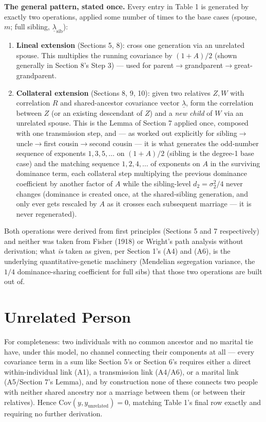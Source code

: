 \documentclass[12pt]{article}
\begin{document}
\textbf{The general pattern, stated once.} Every entry in Table 1 is generated by exactly two operations, applied some number of times to the base cases (spouse, $m$; full sibling, $\underline\lambda_{\mathrm{sib}}$):
\begin{enumerate}
\item \textbf{Lineal extension} (Sections 5, 8): cross one generation via an unrelated spouse. This multiplies the running covariance by $(1+A)/2$ (shown generally in Section 8's Step 3) — used for parent$\to$grandparent$\to$great-grandparent.
\item \textbf{Collateral extension} (Sections 8, 9, 10): given two relatives $Z,W$ with correlation $R$ and shared-ancestor covariance vector $\underline\lambda$, form the correlation between $Z$ (or an existing descendant of $Z$) and a \emph{new child} of $W$ via an unrelated spouse. This is the Lemma of Section 7 applied once, composed with one transmission step, and — as worked out explicitly for sibling$\to$uncle$\to$first cousin$\to$second cousin — it is what generates the odd-number sequence of exponents $1,3,5,\ldots$ on $(1+A)/2$ (sibling is the degree-1 base case) and the matching sequence $1,2,4,\ldots$ of exponents on $A$ in the surviving dominance term, each collateral step multiplying the previous dominance coefficient by another factor of $A$ while the sibling-level $d_2=\sigma_2^2/4$ never changes (dominance is created once, at the shared-sibling generation, and only ever gets rescaled by $A$ as it crosses each subsequent marriage — it is never regenerated).
\end{enumerate}
Both operations were derived from first principles (Sections 5 and 7 respectively) and neither was taken from Fisher (1918) or Wright's path analysis without derivation; what \emph{is} taken as given, per Section 1's (A4) and (A6), is the underlying quantitative-genetic machinery (Mendelian segregation variance, the $1/4$ dominance-sharing coefficient for full sibs) that those two operations are built out of.

\section{Unrelated Person}

For completeness: two individuals with no common ancestor and no marital tie have, under this model, no channel connecting their components at all — every covariance term in a sum like Section 5's or Section 6's requires either a direct within-individual link (A1), a transmission link (A4/A6), or a marital link (A5/Section 7's Lemma), and by construction none of these connects two people with neither shared ancestry nor a marriage between them (or between their relatives). Hence $\mathrm{Cov}(y,y_{\text{unrelated}})=0$, matching Table 1's final row exactly and requiring no further derivation.
\end{document}
